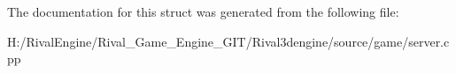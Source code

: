 The documentation for this struct was generated from the following file\+:\begin{DoxyCompactItemize}
\item 
H\+:/\+Rival\+Engine/\+Rival\+\_\+\+Game\+\_\+\+Engine\+\_\+\+G\+I\+T/\+Rival3dengine/source/game/server.\+cpp\end{DoxyCompactItemize}
